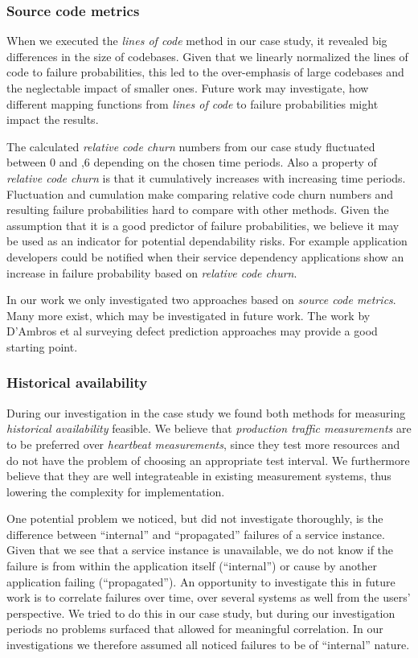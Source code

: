 \subsubsection{Source code metrics}

When we executed the \emph{lines of code} method in our case study, it revealed big differences in the size of codebases. Given that we linearly normalized the lines of code to failure probabilities, this led to the over-emphasis of large codebases and the neglectable impact of smaller ones. Future work may investigate, how different mapping functions from \emph{lines of code} to failure probabilities might impact the results.

The calculated \emph{relative code churn} numbers from our case study fluctuated between 0 and ,6 depending on the chosen time periods. Also a property of \emph{relative code churn} is that it cumulatively increases with increasing time periods. Fluctuation and cumulation make comparing relative code churn numbers and resulting failure probabilities hard to compare with other methods. Given the assumption that it is a good predictor of failure probabilities, we believe it may be used as an indicator for potential dependability risks. For example application developers could be notified when their service dependency applications show an increase in failure probability based on \emph{relative code churn}.

In our work we only investigated two approaches based on \emph{source code metrics}. Many more exist, which may be investigated in future work. The work by D'Ambros et al \cite{DAmbros2011} surveying defect prediction approaches may provide a good starting point.

\subsubsection{Historical availability}

During our investigation in the case study we found both methods for measuring \emph{historical availability} feasible. We believe that \emph{production traffic measurements} are to be preferred over \emph{heartbeat measurements}, since they test more resources and do not have the problem of choosing an appropriate test interval. We furthermore believe that they are well integrateable in existing measurement systems, thus lowering the complexity for implementation.

One potential problem we noticed, but did not investigate thoroughly, is the difference between ``internal'' and ``propagated'' failures of a service instance. Given that we see that a service instance is unavailable, we do not know if the failure is from within the application itself (``internal'') or cause by another application failing (``propagated''). An opportunity to investigate this in future work is to correlate failures over time, over several systems as well from the users' perspective. We tried to do this in our case study, but during our investigation periods no problems surfaced that allowed for meaningful correlation. In our investigations we therefore assumed all noticed failures to be of ``internal'' nature.


